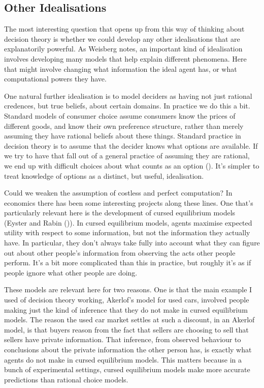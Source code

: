\documentclass[
  12pt,
  letterpaper,
  DIV=11,
  numbers=noendperiod,
  twoside]{scrartcl}
\begin{document}
\subsection{Other Idealisations}\label{other-idealisations}

The most interesting question that opens up from this way of thinking
about decision theory is whether we could develop any other
idealisations that are explanatorily powerful. As Weisberg notes, an
important kind of idealisation involves developing many models that help
explain different phenomena. Here that might involve changing what
information the ideal agent has, or what computational powers they have.

One natural further idealisation is to model deciders as having not just
rational credences, but true beliefs, about certain domains. In practice
we do this a bit. Standard models of consumer choice assume consumers
know the prices of different goods, and know their own preference
structure, rather than merely assuming they have rational beliefs about
these things. Standard practice in decision theory is to assume that the
decider knows what options are available. If we try to have that fall
out of a general practice of assuming they are rational, we end up with
difficult choices about what counts as an option
(). It's simpler to treat
knowledge of options as a distinct, but useful, idealisation.

Could we weaken the assumption of costless and perfect computation? In
economics there has been some interesting projects along these lines.
One that's particularly relevant here is the development of cursed
equilibrium models (Eyster and Rabin
()). In cursed equilibrium models,
agents maximise expected utility with respect to some information, but
not the information they actually have. In particular, they don't always
take fully into account what they can figure out about other people's
information from observing the acts other people perform. It's a bit
more complicated than this in practice, but roughly it's as if people
ignore what other people are doing.

These models are relevant here for two reasons. One is that the main
example I used of decision theory working, Akerlof's model for used
cars, involved people making just the kind of inference that they do not
make in cursed equilibrium models. The reason the used car market
settles at such a discount, in an Akerlof model, is that buyers reason
from the fact that sellers are choosing to sell that sellers have
private information. That inference, from observed behaviour to
conclusions about the private information the other person has, is
exactly what agents do not make in cursed equilibrium models. This
matters because in a bunch of experimental settings, cursed equilibrium
models make more accurate predictions than rational choice models.
\end{document}

